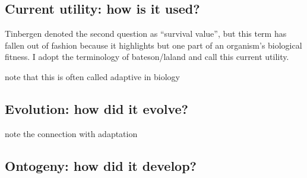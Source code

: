 \documentclass{article}
\begin{document}
\subsection{Current utility: how is it used?}

Tinbergen denoted the second question as ``survival value'', but this term has fallen out of fashion because it highlights but one part of an organism's biological fitness.
I adopt the terminology of bateson/laland and call this current utility.

note that this is often called adaptive in biology

\subsection{Evolution: how did it evolve?}
\label{sec:evolution:-how-did}

note the connection with adaptation

\subsection{Ontogeny: how did it develop?}
\label{sec:ontogeny:-how-did}



\end{document}
